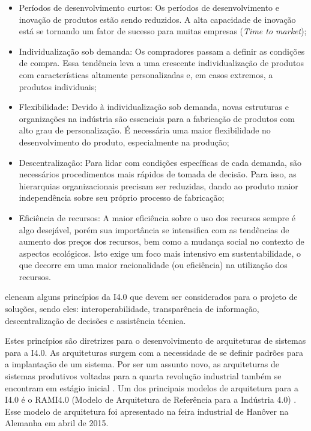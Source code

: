 \begin{itemize}

	\item Períodos de desenvolvimento curtos: Os períodos de desenvolvimento e inovação de produtos estão sendo reduzidos. A alta capacidade de inovação está se tornando um fator de sucesso para muitas empresas (\textit{Time to market});

	\item Individualização sob demanda: Os compradores passam a definir as condições de compra. Essa tendência leva a uma crescente individualização de produtos com características altamente personalizadas e, em casos extremos, a produtos individuais;

	\item Flexibilidade: Devido à individualização sob demanda, novas estruturas e organizações na indústria são essenciais para a fabricação de produtos com alto grau de personalização. É necessária uma maior flexibilidade no desenvolvimento do produto, especialmente na produção;

	\item Descentralização: Para lidar com condições específicas de cada demanda, são necessários procedimentos mais rápidos de tomada de decisão. Para isso, as hierarquias organizacionais precisam ser reduzidas, dando ao produto maior independência sobre seu próprio processo de fabricação;

	\item Eficiência de recursos: A maior eficiência sobre o uso dos recursos sempre é algo desejável, porém sua importância se intensifica com as tendências de aumento dos preços dos recursos, bem como a mudança social no contexto de aspectos ecológicos. Isto exige um foco mais intensivo em sustentabilidade, o que decorre em uma maior racionalidade (ou eficiência) na utilização dos recursos.

\end{itemize}

 elencam alguns princípios da I4.0 que devem ser considerados para o projeto de soluções, sendo eles: interoperabilidade, transparência de informação, descentralização de decisões e assistência técnica.

Estes princípios são diretrizes para o desenvolvimento de arquiteturas de sistemas para a I4.0. As arquiteturas surgem com a necessidade de se definir padrões para a implantação de um sistema. Por ser um assunto novo, as arquiteturas de sistemas produtivos voltadas para a quarta revolução industrial também se encontram em estágio inicial \cite{pisching2018arquitetura}. Um dos principais modelos de arquitetura para a I4.0 é o RAMI4.0 (Modelo de Arquitetura de Referência para a Indústria 4.0) \cite{hankel2015rami}. Esse modelo de arquitetura foi apresentado na feira industrial de Hanôver na Alemanha em abril de 2015.


